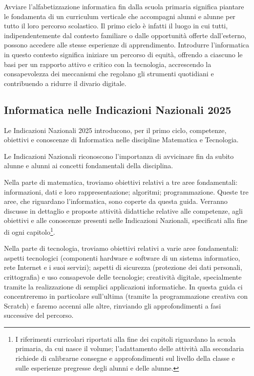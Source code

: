 Avviare l'alfabetizzazione informatica fin dalla scuola primaria significa piantare le fondamenta di un curriculum verticale che accompagni alunni e alunne per tutto il loro percorso scolastico. Il primo ciclo è infatti il luogo in cui tutti, indipendentemente dal contesto familiare o dalle opportunità offerte dall'esterno, possono accedere alle stesse esperienze di apprendimento. Introdurre l'informatica in questo contesto significa iniziare un percorso di equità, offrendo a ciascuno le basi per un rapporto attivo e critico con la tecnologia, accrescendo la consapevolezza dei meccanismi che regolano gli strumenti quotidiani e contribuendo a ridurre il divario digitale.

\subsection{Informatica nelle Indicazioni Nazionali 2025 }\label{informatica-nelle-indicazioni-nazionali-2025}

Le Indicazioni Nazionali 2025 \parencite{mim-indicazioni-2025} introducono, per il primo ciclo, competenze, obiettivi e conoscenze di Informatica nelle discipline Matematica e Tecnologia.

Le Indicazioni Nazionali riconoscono l'importanza di avvicinare fin da subito alunne e alunni ai concetti fondamentali della disciplina.

Nella parte di matematica, troviamo obiettivi relativi a tre aree fondamentali: informazioni, dati e loro rappresentazione; algoritmi; programmazione. Queste tre aree, che riguardano l'informatica, sono coperte da questa guida. Verranno discusse in dettaglio e proposte attività didattiche relative alle competenze, agli obiettivi e alle conoscenze presenti nelle Indicazioni Nazionali, specificati alla fine di ogni capitolo\footnote{I riferimenti curricolari riportati alla fine dei capitoli riguardano la scuola primaria, da cui nasce il volume; l'adattamento delle attività alla secondaria richiede di calibrarne consegne e approfondimenti sul livello della classe e sulle esperienze pregresse degli alunni e delle alunne.}.


Nella parte di tecnologia, troviamo obiettivi relativi a varie aree fondamentali: aspetti tecnologici (componenti hardware e software di un sistema informatico, rete Internet e i suoi servizi); aspetti di sicurezza (protezione dei dati personali, crittografia) e uso consapevole delle tecnologie; creatività digitale, specialmente tramite la realizzazione di semplici applicazioni informatiche. In questa guida ci concentreremo in particolare sull'ultima (tramite la programmazione creativa con Scratch) e faremo accenni alle altre, rinviando gli approfondimenti a fasi successive del percorso.

